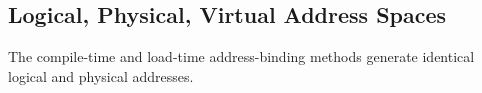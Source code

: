 \subsection{Logical, Physical, Virtual Address Spaces}\label{subsec:Logical_Physical_Virtual_Address_Space}
The compile-time and load-time address-binding methods generate identical logical and physical addresses.


